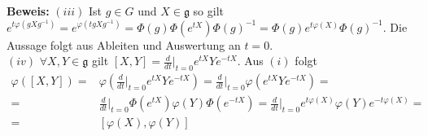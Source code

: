 \documentclass[11pt]{beamer}
\begin{document}
\begin{frame}
	\textbf{Beweis:}
	$(iii)$ Ist $g\in G$ und $X \in \mathfrak{g}$ so gilt
	$e^{t\varphi(gXg^{-1})} = e^{\varphi(tgXg^{-1})}
	= \Phi(g)\Phi(e^{tX})\Phi(g)^{-1} = \Phi(g)e^{t\varphi(X)}\Phi(g)^{-1}$.
	Die Aussage folgt aus Ableiten und Auswertung an $t=0$.\\[1em]

	$(iv)$ $\forall X,Y \in \mathfrak{g}$ gilt $[X,Y] = \frac{d}{dt} \Big \vert_{t=0} e^{tX}Ye^{-tX}$.
	Aus $(i)$ folgt
	\begin{align*}
		\varphi([X,Y]) =&
			\varphi\left(\frac{d}{dt}\Big\vert_{t=0}e^{tX}Ye^{-tX}\right) = \frac{d}{dt}\Big\vert_{t=0}\varphi(e^{tX}Ye^{-tX}) = \\
			=& \frac{d}{dt} \Big\vert_{t=0}\Phi(e^{tX})\varphi(Y)\Phi(e^{-tX}) = \frac{d}{dt}\Big\vert_{t=0}e^{t\varphi(X)}\varphi(Y)e^{-t\varphi(X)} = \\
			=&[\varphi(X), \varphi(Y)]
	\end{align*}

\end{frame}
\end{document}
